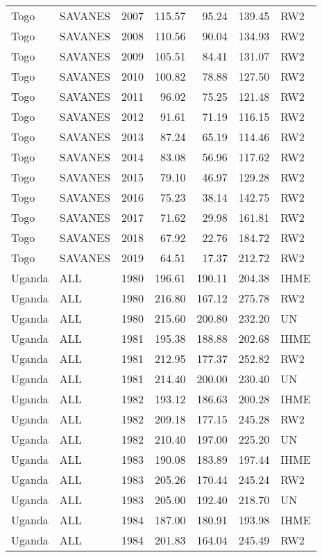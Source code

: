 \begin{longtable}{lllrrrl}
  Togo & SAVANES & 2007 & 115.57 & 95.24 & 139.45 & RW2 \\ 
  Togo & SAVANES & 2008 & 110.56 & 90.04 & 134.93 & RW2 \\ 
  Togo & SAVANES & 2009 & 105.51 & 84.41 & 131.07 & RW2 \\ 
  Togo & SAVANES & 2010 & 100.82 & 78.88 & 127.50 & RW2 \\ 
  Togo & SAVANES & 2011 & 96.02 & 75.25 & 121.48 & RW2 \\ 
  Togo & SAVANES & 2012 & 91.61 & 71.19 & 116.15 & RW2 \\ 
  Togo & SAVANES & 2013 & 87.24 & 65.19 & 114.46 & RW2 \\ 
  Togo & SAVANES & 2014 & 83.08 & 56.96 & 117.62 & RW2 \\ 
  Togo & SAVANES & 2015 & 79.10 & 46.97 & 129.28 & RW2 \\ 
  Togo & SAVANES & 2016 & 75.23 & 38.14 & 142.75 & RW2 \\ 
  Togo & SAVANES & 2017 & 71.62 & 29.98 & 161.81 & RW2 \\ 
  Togo & SAVANES & 2018 & 67.92 & 22.76 & 184.72 & RW2 \\ 
  Togo & SAVANES & 2019 & 64.51 & 17.37 & 212.72 & RW2 \\ 
  Uganda & ALL & 1980 & 196.61 & 190.11 & 204.38 & IHME \\ 
  Uganda & ALL & 1980 & 216.80 & 167.12 & 275.78 & RW2 \\ 
  Uganda & ALL & 1980 & 215.60 & 200.80 & 232.20 & UN \\ 
  Uganda & ALL & 1981 & 195.38 & 188.88 & 202.68 & IHME \\ 
  Uganda & ALL & 1981 & 212.95 & 177.37 & 252.82 & RW2 \\ 
  Uganda & ALL & 1981 & 214.40 & 200.00 & 230.40 & UN \\ 
  Uganda & ALL & 1982 & 193.12 & 186.63 & 200.28 & IHME \\ 
  Uganda & ALL & 1982 & 209.18 & 177.15 & 245.28 & RW2 \\ 
  Uganda & ALL & 1982 & 210.40 & 197.00 & 225.20 & UN \\ 
  Uganda & ALL & 1983 & 190.08 & 183.89 & 197.44 & IHME \\ 
  Uganda & ALL & 1983 & 205.26 & 170.44 & 245.24 & RW2 \\ 
  Uganda & ALL & 1983 & 205.00 & 192.40 & 218.70 & UN \\ 
  Uganda & ALL & 1984 & 187.00 & 180.91 & 193.98 & IHME \\ 
  Uganda & ALL & 1984 & 201.83 & 164.04 & 245.49 & RW2 \\ 

\end{longtable}
